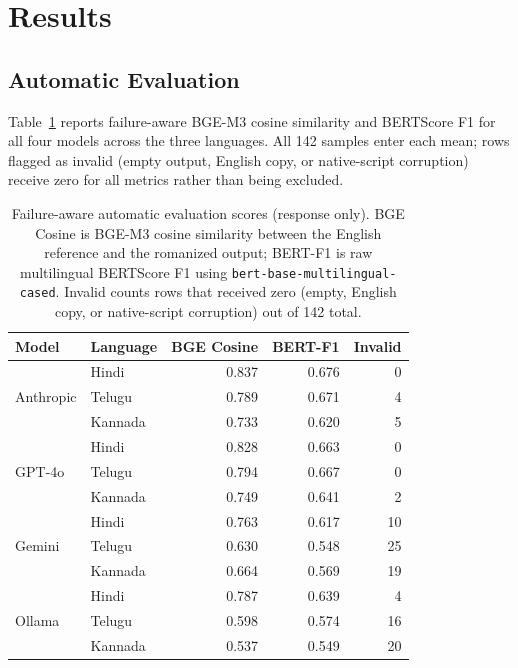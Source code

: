 \section{Results}

\subsection{Automatic Evaluation}

Table~\ref{tab:main-results} reports failure-aware BGE-M3 cosine similarity and
BERTScore F1 for all four models across the three languages. All 142 samples
enter each mean; rows flagged as invalid (empty output, English copy, or
native-script corruption) receive zero for all metrics rather than being
excluded.

\begin{table}[t]
\centering
\small
\begin{tabular}{llrrr}
\toprule
Model & Language & BGE Cosine & BERT-F1 & Invalid \\
\midrule
\multirow{3}{*}{Anthropic} & Hindi   & 0.837 & 0.676 & 0 \\
                            & Telugu  & 0.789 & 0.671 & 4 \\
                            & Kannada & 0.733 & 0.620 & 5 \\
\midrule
\multirow{3}{*}{GPT-4o}    & Hindi   & 0.828 & 0.663 & 0 \\
                            & Telugu  & 0.794 & 0.667 & 0 \\
                            & Kannada & 0.749 & 0.641 & 2 \\
\midrule
\multirow{3}{*}{Gemini}    & Hindi   & 0.763 & 0.617 & 10 \\
                            & Telugu  & 0.630 & 0.548 & 25 \\
                            & Kannada & 0.664 & 0.569 & 19 \\
\midrule
\multirow{3}{*}{Ollama}    & Hindi   & 0.787 & 0.639 & 4  \\
                            & Telugu  & 0.598 & 0.574 & 16 \\
                            & Kannada & 0.537 & 0.549 & 20 \\
\bottomrule
\end{tabular}
\caption{Failure-aware automatic evaluation scores (response only). BGE Cosine
is BGE-M3 cosine similarity between the English reference and the romanized
output; BERT-F1 is raw multilingual BERTScore F1 using
\texttt{bert-base-multilingual-cased}. Invalid counts rows that received zero
(empty, English copy, or native-script corruption) out of 142 total.}
\label{tab:main-results}
\end{table}

